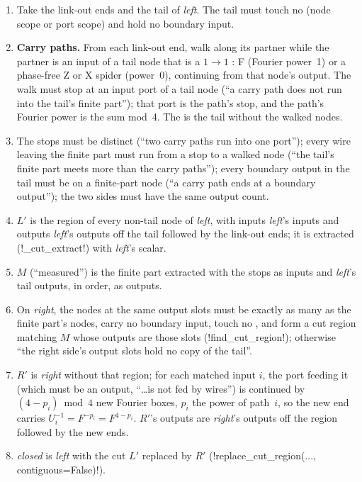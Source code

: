 \begin{algorithm}\label{alg:semantics-open-carry}
\begin{enumerate}
\item Take the link-out ends and the tail of \textit{left}. The tail must touch no \bbox{} (node scope or port scope) and hold no boundary input.
\item \textbf{Carry paths.} From each link-out end, walk along its partner while the partner is an input of a tail node that is a $1\to1$ : F (Fourier power~1) or a phase-free Z or X spider (power~0), continuing from that node's output. The walk must stop at an input port of a tail node (``a carry path does not run into the tail's finite part''); that port is the path's stop, and the path's Fourier power is the sum mod~4. The  is the tail without the walked nodes.
\item The stops must be distinct (``two carry paths run into one port''); every wire leaving the finite part must run from a stop to a walked node (``the tail's finite part meets more than the carry paths''); every boundary output in the tail must be on a finite-part node (``a carry path ends at a boundary output''); the two sides must have the same output count.
\item $L'$ is the region of every non-tail node of \textit{left}, with inputs \textit{left}'s inputs and outputs \textit{left}'s outputs off the tail followed by the link-out ends; it is extracted (\py!_cut_extract!) with \textit{left}'s scalar.
\item $M$ (``measured'') is the finite part extracted with the stops as inputs and \textit{left}'s tail outputs, in order, as outputs.
\item On \textit{right}, the nodes at the same output slots must be exactly as many as the finite part's nodes, carry no boundary input, touch no \bbox{}, and form a cut region matching $M$ whose outputs are those slots (\py!find_cut_region!); otherwise ``the right side's output slots hold no copy of the tail''.
\item $R'$ is \textit{right} without that region; for each matched input $i$, the port feeding it (which must be an output, ``\ldots is not fed by wires'') is continued by $(4-p_i)\bmod 4$ new Fourier boxes, $p_i$ the power of path~$i$, so the new end carries $U_i^{-1}=F^{-p_i}=F^{4-p_i}$. $R'$'s outputs are \textit{right}'s outputs off the region followed by the new ends.
\item \textit{closed} is \textit{left} with the cut $L'$ replaced by $R'$ (\py!replace_cut_region(..., contiguous=False)!).
\end{enumerate}
\end{algorithm}


